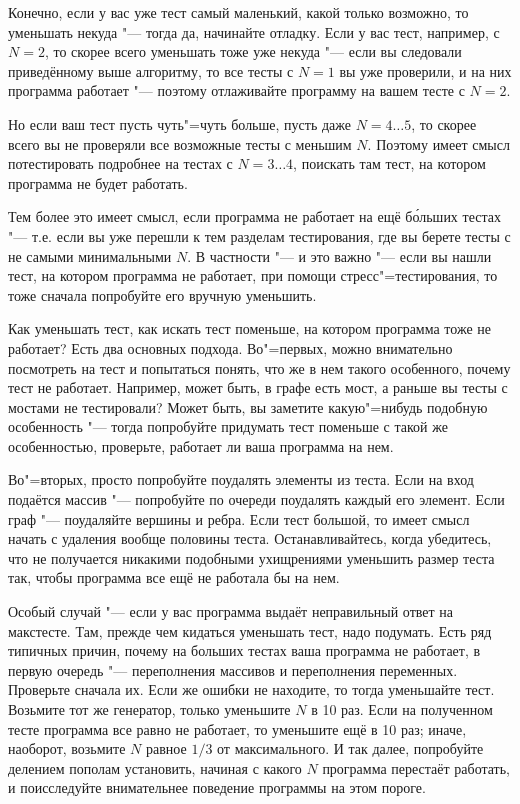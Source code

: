 Конечно, если у вас уже тест самый маленький, какой только возможно, то уменьшать некуда "--- тогда да, начинайте отладку. 
Если у вас тест, например, с $N=2$, то скорее всего уменьшать тоже уже некуда "--- если вы следовали приведённому выше алгоритму,
то все тесты с $N=1$ вы уже проверили, и на них программа работает "--- поэтому отлаживайте программу на вашем тесте с $N=2$.

Но если ваш тест пусть чуть"=чуть больше, пусть даже $N=4\dots5$, то скорее всего вы не проверяли все возможные тесты с меньшим $N$. 
Поэтому имеет смысл потестировать подробнее на тестах с $N=3\dots4$, поискать там тест, на котором программа не будет работать.

Тем более это имеет смысл, если программа не работает на ещё б\'{о}льших тестах "--- т.е. если вы уже перешли к тем разделам тестирования,
где вы берете тесты с не самыми минимальными $N$. 
В частности "--- и это важно "--- если вы нашли тест, на котором программа не работает, при помощи стресс"=тестирования,
то тоже сначала попробуйте его вручную уменьшить. 

Как уменьшать тест, как искать тест поменьше, на котором программа тоже не работает?
Есть два основных подхода. 
Во"=первых, можно внимательно посмотреть на тест и попытаться понять, что же в нем такого особенного, почему тест не работает. 
Например, может быть, в графе есть мост, а раньше вы тесты с мостами не тестировали? 
Может быть, вы заметите какую"=нибудь подобную особенность "--- тогда попробуйте придумать тест поменьше с такой же особенностью,
проверьте, работает ли ваша программа на нем.

Во"=вторых, просто попробуйте поудалять элементы из теста. Если на вход подаётся массив "--- попробуйте по очереди поудалять каждый его элемент.
Если граф "--- поудаляйте вершины и ребра. 
Если тест большой, то имеет смысл начать с удаления вообще половины теста.
Останавливайтесь, когда убедитесь, что не получается никакими подобными ухищрениями уменьшить размер теста так, чтобы программа все ещё не работала бы на нем.

Особый случай "--- если у вас программа выдаёт неправильный ответ на макстесте. 
Там, прежде чем кидаться уменьшать тест, надо подумать. 
Есть ряд типичных причин, почему на больших тестах ваша программа не работает, в первую очередь "--- переполнения массивов и переполнения переменных.
Проверьте сначала их.
Если же ошибки не находите, то тогда уменьшайте тест. 
Возьмите тот же генератор, только уменьшите $N$ в 10 раз.
Если на полученном тесте программа все равно не работает, то уменьшите ещё в 10 раз; иначе, наоборот, возьмите $N$ равное $1/3$ от максимального.
И так далее, попробуйте делением пополам установить, начиная с какого $N$ программа перестаёт работать, и поисследуйте внимательнее поведение программы
на этом пороге.

